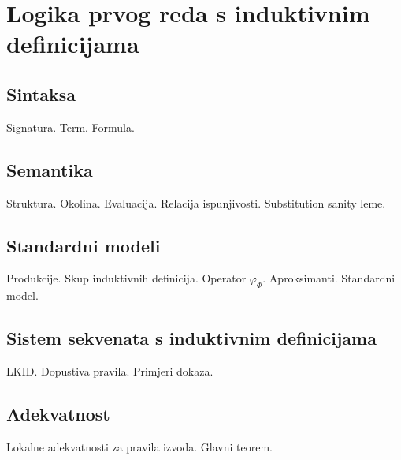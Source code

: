 \chapter{Logika prvog reda s induktivnim definicijama}\label{cha:logika-prvog-reda}

\section{Sintaksa}\label{sec:sintaksa}
Signatura. Term. Formula.

\section{Semantika}\label{sec:semantika}
Struktura. Okolina. Evaluacija. Relacija ispunjivosti. Substitution sanity leme.

\section{Standardni modeli}\label{sec:standardni-modeli}
Produkcije. Skup induktivnih definicija. Operator \(\varphi_{\Phi}\). Aproksimanti. Standardni model.

\section{Sistem sekvenata s induktivnim definicijama}\label{sec:sistem-sekvenata}
LKID. Dopustiva pravila. Primjeri dokaza.

\section{Adekvatnost}\label{sec:adekvatnost}
Lokalne adekvatnosti za pravila izvoda. Glavni teorem.

